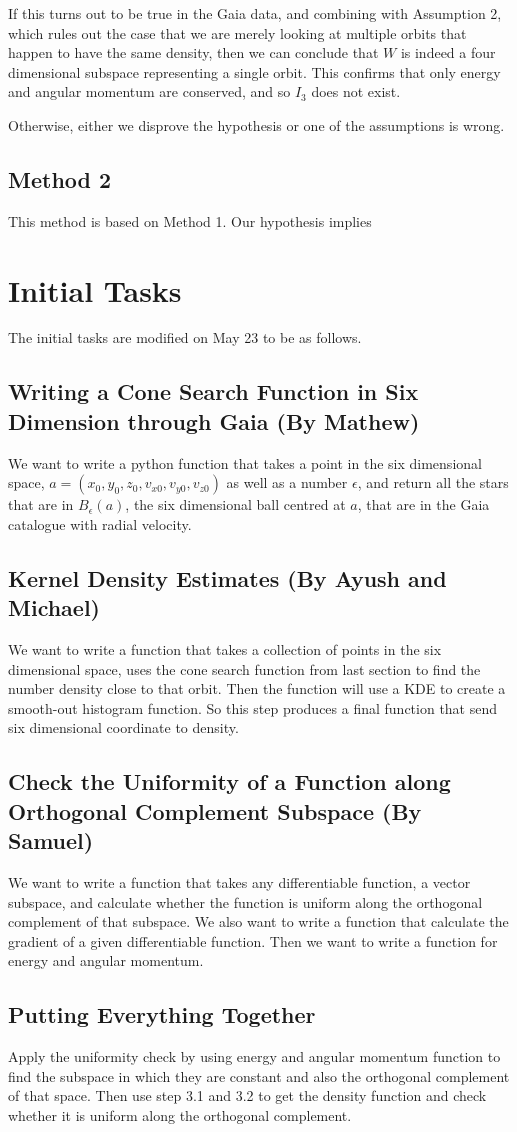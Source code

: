 \documentclass[12pt]{article}
\begin{document}
If this turns out to be true in the Gaia data, and combining with Assumption 2, which rules out the case that we are merely looking at multiple orbits that happen to have the same density, then we can conclude that $W$ is indeed a four dimensional subspace representing a single orbit. This confirms that only energy and angular momentum are conserved, and so $I_3$ does not exist. 

Otherwise, either we disprove the hypothesis or one of the assumptions is wrong.

\subsection*{Method 2}
This method is based on Method 1. Our hypothesis implies

\section{Initial Tasks}
The initial tasks are modified on May 23 to be as follows.
\subsection{Writing a Cone Search Function in Six Dimension through Gaia (By Mathew)}
We want to write a python function that takes a point in the six dimensional space, $ a = (x_0, y_0, z_0, v_{x0}, v_{y0}, v_{z0})$ as well as a number $\epsilon$, and return all the stars that are in $B_\epsilon(a)$, the six dimensional ball centred at $a$, that are in the Gaia catalogue with radial velocity.
\subsection{Kernel Density Estimates (By Ayush and Michael)}
We want to write a function that takes a collection of points in the six dimensional space, uses the cone search function from last section to find the number density close to that orbit. Then the function will use a KDE to create a smooth-out histogram function. So this step produces a final function that send six dimensional coordinate to density.
\subsection{Check the Uniformity of a Function along Orthogonal Complement Subspace (By Samuel)}
We want to write a function that takes any differentiable function, a vector subspace, and calculate whether the function is uniform along the orthogonal complement of that subspace. We also want to write a function that calculate the gradient of a given differentiable function. Then we want to write a function for energy and angular momentum. 
\subsection{Putting Everything Together}
Apply the uniformity check by using energy and angular momentum function to find the subspace in which they are constant and also the orthogonal complement of that space. Then use step 3.1 and 3.2 to get the density function and check whether it is uniform along the orthogonal complement.
 
\end{document}
